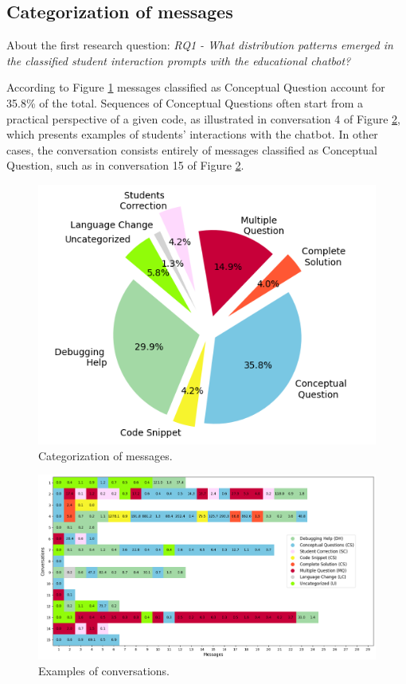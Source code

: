 \documentclass[a4paper,twoside]{article}
\begin{document}
\subsection{Categorization of messages}

About the first research question: \textit{RQ1 - What distribution patterns
emerged in the classified student interaction prompts with the educational
chatbot?}

According to Figure \ref{fig:graph1} messages classified as
Conceptual Question account for 35.8\% of the total. Sequences of Conceptual
Questions often start from a practical perspective of a given code, as
illustrated in conversation 4 of Figure \ref{fig:graph2}, which presents
examples of students' interactions with the chatbot. In other cases, the
conversation consists entirely of messages classified as Conceptual Question,
such as in conversation 15 of Figure \ref{fig:graph2}.

\begin{figure}[h!]
  \centering
  \includegraphics[scale=0.62]{img/figure1.png}
  \caption{Categorization of messages.}
  \label{fig:graph1}
\end{figure}

\begin{figure}[htbp]
  \centering
  \includegraphics[scale=0.45]{img/figure2.png}
  \caption{Examples of conversations.}
  \label{fig:graph2}
\end{figure}
\end{document}

